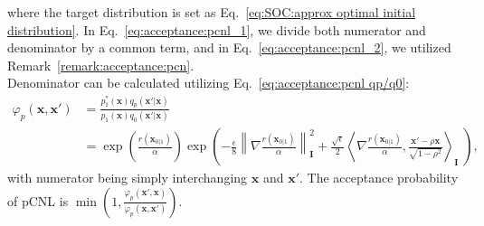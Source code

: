 where the target distribution is set as Eq.~\ref{eq:SOC:approx optimal initial distribution}. In Eq.~\ref{eq:acceptance:pcnl_1}, we divide both numerator and denominator by a common term, and in Eq.~\ref{eq:acceptance:pcnl_2}, we utilized Remark~\ref{remark:acceptance:pcn}.\\
Denominator can be calculated utilizing Eq.~\ref{eq:acceptance:pcnl qp/q0}:
\begin{align}
    \label{eq:acceptance:pcnl:varphi}
    \varphi_p( \mathbf{x}, \mathbf{x}')&=\frac{p_1^*(\mathbf{x})q_p(\mathbf{x}'|\mathbf{x})}{p_1(\mathbf{x})q_0(\mathbf{x}'|\mathbf{x})}\\
    &=\exp \left(\frac{r(\mathbf{x}_{0|1})}{\alpha} \right)\exp \left( -\frac{\epsilon}{8}\left\| \nabla \frac{r(\mathbf{x}_{0|1})}{\alpha} \right\|^2_\mathbf{I} + \frac{\sqrt{\epsilon}}{2}\left\langle \nabla \frac{r(\mathbf{x}_{0|1})}{\alpha}, \frac{\mathbf{x}'-\rho \mathbf{x}}{\sqrt{1-\rho^2}} \right\rangle_{\mathbf{I}}\; \right),
\end{align}
with numerator being simply interchanging $\mathbf{x}$ and $\mathbf{x}'$.
The acceptance probability of pCNL is $\min \left(1, \frac{\varphi_p(\mathbf{x}',\mathbf{x})}{\varphi_p(\mathbf{x}, \mathbf{x}')} \right)$.


